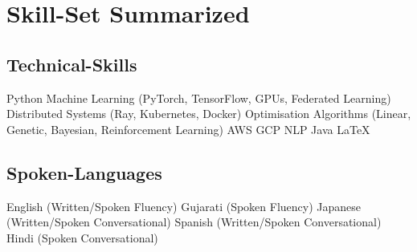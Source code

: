 \documentclass[a4paper]{deedy-resume} %
\begin{document}
\section{Skill-Set Summarized}
\vspace{-10pt}
\begin{multicols}{2}
    \subsection{Technical-Skills}
    Python
    \textbullet{} Machine Learning (PyTorch, TensorFlow, GPUs, Federated Learning)
    \textbullet{} Distributed Systems (Ray, Kubernetes, Docker)
    \textbullet{} Optimisation Algorithms (Linear, Genetic, Bayesian, Reinforcement Learning)
    \textbullet{} AWS
    \textbullet{} GCP
    \textbullet{} NLP
    \textbullet{} Java
    \textbullet{} \LaTeX

    \columnbreak

    \subsection{Spoken-Languages}
    \vspace{-1pt}
    English (Written/Spoken Fluency)
    \textbullet{} Gujarati (Spoken Fluency)
    \textbullet{} Japanese (Written/Spoken Conversational)
    \textbullet{} Spanish (Written/Spoken Conversational)
    \textbullet{} Hindi (Spoken Conversational)
\end{multicols}
\end{document}
